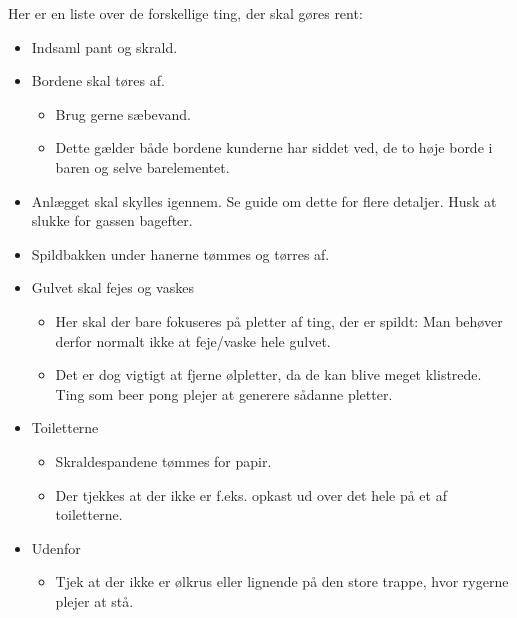 Her er en liste over de forskellige ting, der skal gøres rent:
\begin{itemize}
\item Indsaml pant og skrald.
\item Bordene skal tøres af.
  \begin{itemize}
  \item Brug gerne sæbevand.
  \item Dette gælder både bordene kunderne har siddet ved, de to høje
    borde i baren og selve barelementet.
  \end{itemize}
\item Anlægget skal skylles igennem. Se guide om dette for flere
  detaljer. Husk at slukke for gassen bagefter.
\item Spildbakken under hanerne tømmes og tørres af.
\item Gulvet skal fejes og vaskes
  \begin{itemize}
  \item Her skal der bare fokuseres på pletter af ting, der er spildt:
    Man behøver derfor normalt ikke at feje/vaske hele gulvet.
  \item Det er dog vigtigt at fjerne ølpletter, da de kan blive meget
    klistrede. Ting som beer pong plejer at generere sådanne pletter.
  \end{itemize}
\item Toiletterne
  \begin{itemize}
  \item Skraldespandene tømmes for papir.
  \item Der tjekkes at der ikke er f.eks. opkast ud over det hele på
    et af toiletterne.
  \end{itemize}
\item Udenfor
  \begin{itemize}
  \item Tjek at der ikke er ølkrus eller lignende på den store trappe,
    hvor rygerne plejer at stå.
  \end{itemize}
\end{itemize}

